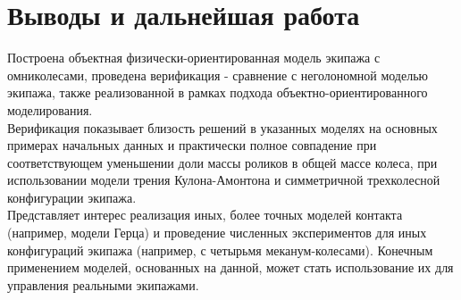 \documentclass[12pt]{article}
\begin{document}
\section{Выводы и дальнейшая работа}

Построена объектная физически-ориентированная модель экипажа с омниколесами, проведена верификация - сравнение с неголономной моделью экипажа, также реализованной в рамках подхода объектно-ориентированного моделирования.\\

Верификация показывает близость решений в указанных моделях на основных примерах начальных данных и практически полное совпадение при соответствующем уменьшении доли массы роликов в общей массе колеса, при использовании модели трения Кулона-Амонтона и симметричной трехколесной конфигурации экипажа.\\

Представляет интерес реализация иных, более точных моделей контакта (например, модели Герца) и проведение численных экспериментов для иных конфигураций экипажа (например, с четырьмя меканум-колесами). Конечным применением моделей, основанных на данной, может стать использование их для управления реальными экипажами.

\end{document}
